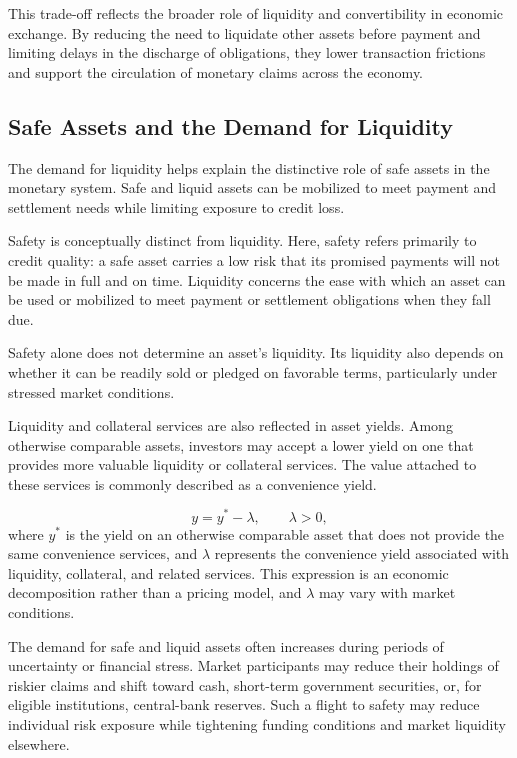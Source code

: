 This trade-off reflects the broader role of liquidity and convertibility in economic exchange. By reducing the need to liquidate other assets before payment and limiting delays in the discharge of obligations, they lower transaction frictions and support the circulation of monetary claims across the economy.

\subsection{Safe Assets and the Demand for Liquidity}

The demand for liquidity helps explain the distinctive role of safe assets in the monetary system. Safe and liquid assets can be mobilized to meet payment and settlement needs while limiting exposure to credit loss.

Safety is conceptually distinct from liquidity. Here, safety refers primarily to credit quality: a safe asset carries a low risk that its promised payments will not be made in full and on time. Liquidity concerns the ease with which an asset can be used or mobilized to meet payment or settlement obligations when they fall due.

Safety alone does not determine an asset's liquidity. Its liquidity also depends on whether it can be readily sold or pledged on favorable terms, particularly under stressed market conditions.

Liquidity and collateral services are also reflected in asset yields. Among otherwise comparable assets, investors may accept a lower yield on one that provides more valuable liquidity or collateral services. The value attached to these services is commonly described as a convenience yield.

\begin{equation}
y
=
y^{*}-\lambda,
\qquad \lambda>0,
\label{eq:ch2-convenience-yield}
\end{equation}
where $y^{*}$ is the yield on an otherwise comparable asset that does not provide the same convenience services, and $\lambda$ represents the convenience yield associated with liquidity, collateral, and related services. This expression is an economic decomposition rather than a pricing model, and $\lambda$ may vary with market conditions.

The demand for safe and liquid assets often increases during periods of uncertainty or financial stress. Market participants may reduce their holdings of riskier claims and shift toward cash, short-term government securities, or, for eligible institutions, central-bank reserves. Such a flight to safety may reduce individual risk exposure while tightening funding conditions and market liquidity elsewhere.

